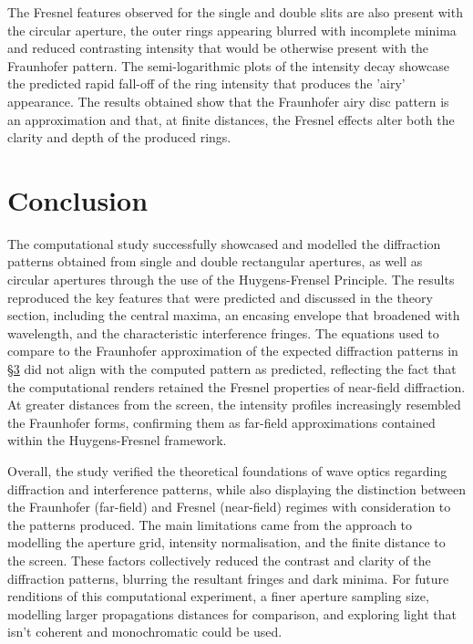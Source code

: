 \documentclass[12pt]{article}
\begin{document}
The Fresnel features observed for the single and double slits are also present with the circular aperture, the outer rings appearing blurred with incomplete minima and reduced contrasting intensity that would be otherwise present with the Fraunhofer pattern.
The semi-logarithmic plots of the intensity decay showcase the predicted rapid fall-off of the ring intensity that produces the 'airy' appearance. The results obtained show that the Fraunhofer airy disc pattern is an approximation and that, at finite distances, the Fresnel
effects alter both the clarity and depth of the produced rings.

\section{Conclusion} \label{sec:6}

The computational study successfully showcased and modelled the diffraction patterns obtained from single and double rectangular apertures, as well as circular apertures through the use of the Huygens-Frensel Principle.
The results reproduced the key features that were predicted and discussed in the theory section, including the central maxima, an encasing envelope that broadened with wavelength, and the characteristic interference fringes.
The equations used to compare to the Fraunhofer approximation of the expected diffraction patterns in \hyperref[sec:3]{§3} did not align with the computed pattern as predicted, reflecting the fact that the computational renders retained the Fresnel properties of near-field diffraction.
At greater distances from the screen, the intensity profiles increasingly resembled the Fraunhofer forms, confirming them as far-field approximations contained within the Huygens-Fresnel framework.

Overall, the study verified the theoretical foundations of wave optics regarding diffraction and interference patterns, while also displaying the distinction between the Fraunhofer (far-field) and Fresnel (near-field) regimes with consideration to the patterns produced.
The main limitations came from the approach to modelling the aperture grid, intensity normalisation, and the finite distance to the screen. These factors collectively reduced the contrast and clarity of the diffraction patterns, blurring the resultant fringes and dark minima.
For future renditions of this computational experiment, a finer aperture sampling size, modelling larger propagations distances for comparison, and exploring light that isn't coherent and monochromatic could be used.
\end{document}
